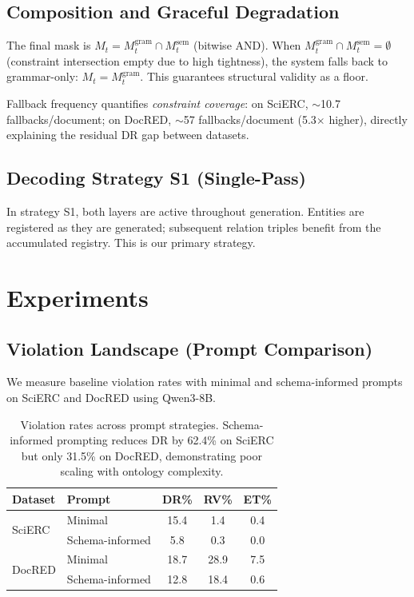 \documentclass[11pt]{article}
\begin{document}
\subsection{Composition and Graceful Degradation}

The final mask is $M_t = M^{\text{gram}}_t \cap M^{\text{sem}}_t$ (bitwise AND). When $M^{\text{gram}}_t \cap M^{\text{sem}}_t = \emptyset$ (constraint intersection empty due to high tightness), the system falls back to grammar-only: $M_t = M^{\text{gram}}_t$. This guarantees structural validity as a floor.

Fallback frequency quantifies \emph{constraint coverage}: on SciERC, $\sim$10.7 fallbacks/document; on DocRED, $\sim$57 fallbacks/document (5.3$\times$ higher), directly explaining the residual DR gap between datasets.

\subsection{Decoding Strategy S1 (Single-Pass)}

In strategy S1, both layers are active throughout generation. Entities are registered as they are generated; subsequent relation triples benefit from the accumulated registry. This is our primary strategy.

\section{Experiments}

\subsection{Violation Landscape (Prompt Comparison)}
\label{sec:prompt}

We measure baseline violation rates with minimal and schema-informed prompts on SciERC and DocRED using Qwen3-8B.

\begin{table}[t]
\centering
\small
\begin{tabular}{llccc}
\toprule
\textbf{Dataset} & \textbf{Prompt} & \textbf{DR\%} & \textbf{RV\%} & \textbf{ET\%} \\
\midrule
\multirow{2}{*}{SciERC} & Minimal & 15.4 & 1.4 & 0.4 \\
 & Schema-informed & 5.8 & 0.3 & 0.0 \\
\midrule
\multirow{2}{*}{DocRED} & Minimal & 18.7 & 28.9 & 7.5 \\
 & Schema-informed & 12.8 & 18.4 & 0.6 \\
\bottomrule
\end{tabular}
\caption{Violation rates across prompt strategies. Schema-informed prompting reduces DR by 62.4\% on SciERC but only 31.5\% on DocRED, demonstrating poor scaling with ontology complexity.}
\label{tab:prompt}
\end{table}
\end{document}
